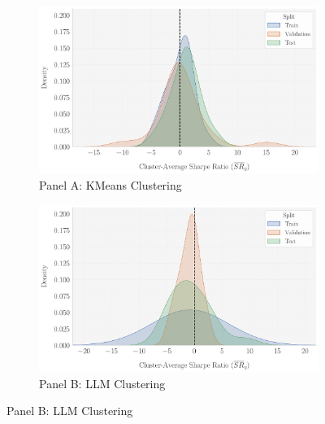 \begin{figure}[htbp]
\caption{Distribution of Cluster-Average Sharpe Ratios $(\overline{SR}_g)$ by Split}
\label{fig:cluster-average-SR-by-split}

\begin{subfigure}[t]{0.49\textwidth}
\caption{Panel A: KMeans Clustering}
\centering
\includegraphics[width=\textwidth]{fig_A5a_KMeans_Cluster-Avg_SR_Distribution.pdf}
\end{subfigure}
\hfill
\begin{subfigure}[t]{0.49\textwidth}
\caption{Panel B: LLM Clustering}
\centering
\includegraphics[width=\textwidth]{fig_A5b_LLAMA_Cluster-Avg_SR_Distribution.pdf}
\end{subfigure}


\end{figure}
